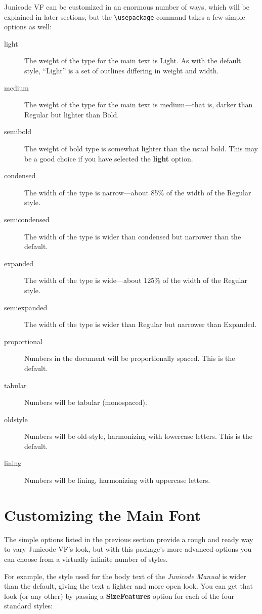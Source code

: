 \documentclass[12pt]{article}
\begin{document}
Junicode VF can be customized in an enormous number of ways, which will be explained
in later sections, but the {\verb|\usepackage|} command takes a few simple options
as well:

\begin{description}
    \item[light] The weight of the type for the main text is Light. As with the default
    style, “Light” is a set of outlines differing in weight and width.
    \item[medium] The weight of the type for the main text is medium---that is, darker than
    Regular but lighter than Bold.
    \item[semibold] The weight of bold type is somewhat lighter than the usual bold. This may be a
    good choice if you have selected the \textbf{light} option.
    \item[condensed] The width of the type is narrow---about 85\% of the width of the Regular style.
    \item[semicondensed] The width of the type is wider than condensed but narrower than the default.
    \item[expanded] The width of the type is wide---about 125\% of the width of the Regular style.
    \item[semiexpanded] The width of the type is wider than Regular but narrower than Expanded.
    \item[proportional] Numbers in the document will be proportionally spaced. This is the default.
    \item[tabular] Numbers will be tabular (monospaced).
    \item[oldstyle] Numbers will be old-style, harmonizing with lowercase letters. This is the default.
    \item[lining] Numbers will be lining, harmonizing with uppercase letters.
\end{description}

\section{Customizing the Main Font}

The simple options listed in the previous section provide a rough and ready
way to vary Junicode VF's look, but with this package's more advanced options you can choose
from a virtually infinite number of styles.

For example, the style used for the body text of the \textit{Junicode Manual}
is wider than the default, giving the text a lighter and more open look. You
can get that look (or any other) by passing a \textbf{SizeFeatures} option for 
each of the four standard styles:
\end{document}
